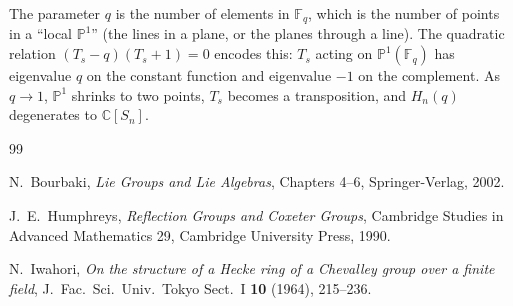 \documentclass[12pt,a4paper]{article}
\theoremstyle{definition}
\theoremstyle{remark}
\newcommand{\C}{\mathbb{C}}
\newcommand{\F}{\mathbb{F}}
\newcommand{\PP}{\mathbb{P}}
\begin{document}
The parameter $q$ is the number of elements in $\F_q$, which is the
number of points in a ``local $\PP^1$'' (the lines in a plane, or the
planes through a line). The quadratic relation $(T_s - q)(T_s + 1) = 0$
encodes this: $T_s$ acting on $\PP^1(\F_q)$ has eigenvalue $q$ on the
constant function and eigenvalue $-1$ on the complement. As $q \to 1$,
$\PP^1$ shrinks to two points, $T_s$ becomes a transposition, and
$H_n(q)$ degenerates to $\C[S_n]$.

\begin{thebibliography}{99}

N.~Bourbaki,
\emph{Lie Groups and Lie Algebras}, Chapters 4--6,
Springer-Verlag, 2002.

J.~E.~Humphreys,
\emph{Reflection Groups and Coxeter Groups},
Cambridge Studies in Advanced Mathematics 29,
Cambridge University Press, 1990.

N.~Iwahori,
\emph{On the structure of a Hecke ring of a Chevalley group over a
finite field},
J.~Fac.\ Sci.\ Univ.\ Tokyo Sect.\ I \textbf{10} (1964), 215--236.

\end{thebibliography}
\end{document}
